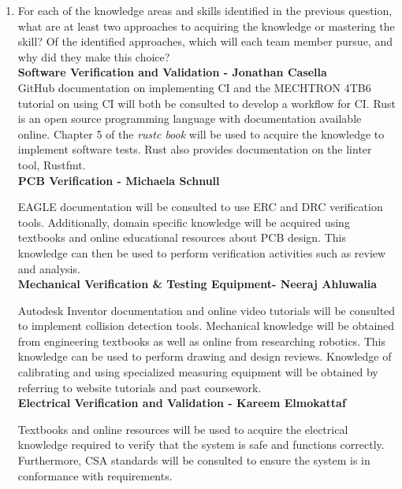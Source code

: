 \documentclass[12pt, titlepage]{article}
\begin{document}
\begin{enumerate}
  \item For each of the knowledge areas and skills identified in the previous
  question, what are at least two approaches to acquiring the knowledge or
  mastering the skill?  Of the identified approaches, which will each team
  member pursue, and why did they make this choice?\\
  
\textbf{Software Verification and Validation - Jonathan Casella}\\

GitHub documentation on implementing CI and the MECHTRON 4TB6 tutorial on using CI will both be consulted to develop a workflow for CI. Rust is an open source programming language with documentation available online. Chapter 5 of the \textit{rustc book} will be used to acquire the knowledge to implement software tests. Rust also provides documentation on the linter tool, Rustfmt.  \\

\textbf{PCB Verification - Michaela Schnull}

EAGLE documentation will be consulted to use ERC and DRC verification tools. Additionally, domain specific knowledge will be acquired using textbooks and online educational resources about PCB design. This knowledge can then be used to perform verification activities such as review and analysis.\\

\textbf{Mechanical Verification \& Testing Equipment- Neeraj Ahluwalia}

Autodesk Inventor documentation and online video tutorials will be consulted to implement collision detection tools. Mechanical knowledge will be obtained from engineering textbooks as well as online from researching robotics. This knowledge can be used to perform drawing and design reviews. Knowledge of calibrating and using specialized measuring equipment will be obtained by referring to website tutorials and past coursework.\\

\textbf{Electrical Verification and Validation - Kareem Elmokattaf}

Textbooks and online resources will be used to acquire the electrical knowledge required to verify that the system is safe and functions correctly. Furthermore, CSA standards will be consulted to ensure the system is in conformance with requirements. \\  
\end{enumerate}
\end{document}
